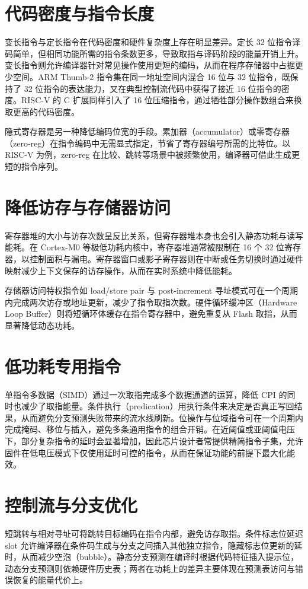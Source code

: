 \section{代码密度与指令长度}
变长指令与定长指令在代码密度和硬件复杂度上存在明显差异。定长 32 位指令译码简单，但相同功能所需的指令条数更多，导致取指与译码阶段的能量开销上升。变长指令则允许编译器针对常见操作使用更短的编码，从而在程序存储器中占据更少空间。ARM Thumb-2 指令集在同一地址空间内混合 16 位与 32 位指令，既保持了 32 位指令的表达能力，又在典型控制流代码中获得了接近 16 位指令的密度。RISC-V 的 C 扩展同样引入了 16 位压缩指令，通过牺牲部分操作数组合来换取更高的代码密度。\par
隐式寄存器是另一种降低编码位宽的手段。累加器（accumulator）或零寄存器（zero-reg）在指令编码中无需显式指定，节省了寄存器编号所需的比特位。以 RISC-V 为例，zero-reg 在比较、跳转等场景中被频繁使用，编译器可借此生成更短的指令序列。\par
\section{降低访存与存储器访问}
寄存器堆的大小与访存次数呈反比关系，但寄存器堆本身也会引入静态功耗与读写能耗。在 Cortex-M0 等极低功耗内核中，寄存器堆通常被限制在 16 个 32 位寄存器，以控制面积与漏电。寄存器窗口或影子寄存器则在中断或任务切换时通过硬件映射减少上下文保存的访存操作，从而在实时系统中降低能耗。\par
存储器访问特权指令如 load/store pair 与 post-increment 寻址模式可在一个周期内完成两次访存或地址更新，减少了指令取指次数。硬件循环缓冲区（Hardware Loop Buffer）则将短循环体缓存在指令寄存器中，避免重复从 Flash 取指，从而显著降低动态功耗。\par
\section{低功耗专用指令}
单指令多数据（SIMD）通过一次取指完成多个数据通道的运算，降低 CPI 的同时也减少了取指能量。条件执行（predication）用执行条件来决定是否真正写回结果，从而避免分支预测失败带来的流水线刷新。位操作与位域指令可在一个周期内完成掩码、移位与插入，避免多条通用指令的组合开销。在近阈值或亚阈值电压下，部分复杂指令的延时会显著增加，因此芯片设计者常提供精简指令子集，允许固件在低电压模式下仅使用延时可控的指令，从而在保证功能的前提下最大化能效。\par
\section{控制流与分支优化}
短跳转与相对寻址可将跳转目标编码在指令内部，避免访存取指。条件标志位延迟 slot 允许编译器在条件码生成与分支之间插入其他独立指令，隐藏标志位更新的延时，从而减少空泡（bubble）。静态分支预测在编译时根据代码特征插入提示位，动态分支预测则依赖硬件历史表；两者在功耗上的差异主要体现在预测表访问与错误恢复的能量代价上。\par
